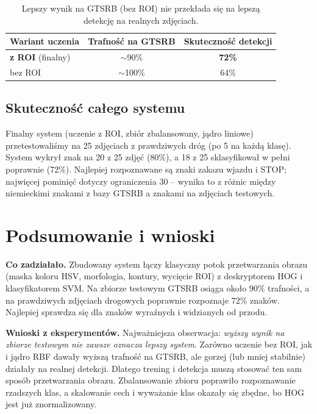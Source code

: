 \documentclass[12pt,oneside]{article}
\begin{document}
\begin{table}[H]
\centering
\begin{tabular}{lcc}
    \toprule
    Wariant uczenia & Trafność na GTSRB & Skuteczność detekcji \\
    \midrule
    \textbf{z ROI} (finalny) & $\sim$90\%  & \textbf{72\%} \\
    bez ROI                  & $\sim$100\% & 64\% \\
    \bottomrule
\end{tabular}
\caption{Lepszy wynik na GTSRB (bez ROI) nie przekłada się na lepszą detekcję na
         realnych zdjęciach.}
\label{tab:roi}
\end{table}

\subsection{Skuteczność całego systemu}
Finalny system (uczenie z ROI, zbiór zbalansowany, jądro liniowe) przetestowaliśmy
na 25 zdjęciach z prawdziwych dróg (po 5 na każdą klasę). System wykrył znak na 20
z 25 zdjęć (80\%), a 18 z 25 sklasyfikował w pełni poprawnie (72\%). Najlepiej
rozpoznawane są znaki zakazu wjazdu i STOP; najwięcej pominięć dotyczy ograniczenia
30 -- wynika to z różnic między niemieckimi znakami z bazy GTSRB a znakami na
zdjęciach testowych.

\section{Podsumowanie i wnioski}
\textbf{Co zadziałało.} Zbudowany system łączy klasyczny potok przetwarzania obrazu
(maska koloru HSV, morfologia, kontury, wycięcie ROI) z deskryptorem HOG i
klasyfikatorem SVM. Na zbiorze testowym GTSRB osiąga około 90\% trafności, a na
prawdziwych zdjęciach drogowych poprawnie rozpoznaje 72\% znaków. Najlepiej sprawdza
się dla znaków wyraźnych i widzianych od przodu.

\textbf{Wnioski z eksperymentów.} Najważniejsza obserwacja: \emph{wyższy wynik na
zbiorze testowym nie zawsze oznacza lepszy system}. Zarówno uczenie bez ROI, jak i
jądro RBF dawały wyższą trafność na GTSRB, ale gorzej (lub mniej stabilnie) działały
na realnej detekcji. Dlatego trening i detekcja muszą stosować ten sam sposób
przetwarzania obrazu. Zbalansowanie zbioru poprawiło rozpoznawanie rzadszych klas, a
skalowanie cech i wyważanie klas okazały się zbędne, bo HOG jest już znormalizowany.
\end{document}
